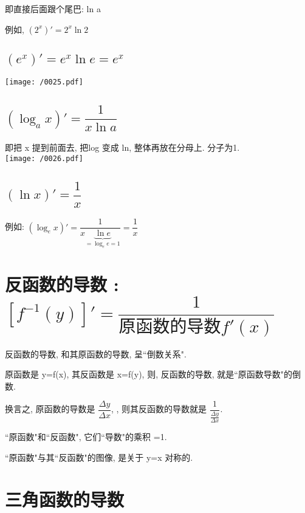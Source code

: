 \documentclass[UTF8]{ctexart}
\begin{document}
即直接后面跟个尾巴: ln a

例如, $(2^x)' = 2^x \ln 2$




\subsection{$(e^x)' = e^x \ln e = e^x$}

\texttt{[image: /0025.pdf]}




\subsection{$(\log_a x)' = \dfrac{1} {x \ln a}$}

即把 x 提到前面去, 把log 变成 ln, 整体再放在分母上. 分子为1. \\

\texttt{[image: /0026.pdf]}



\subsection{$(\ln x)' = \dfrac{1} {x}$}

例如: 
$\left( \log _ex \right) '=\dfrac{1}{x\underset{=\log _ee=1}{\underbrace{\ln e}}}=\dfrac{1}{x}$



\section{反函数的导数 : $\boxed{[f^{-1}(y)]' = \dfrac{1} {\text{原函数的导数} f'(x)}}$}


反函数的导数, 和其原函数的导数, 呈``倒数关系". 

原函数是 y=f(x), 其反函数是 x=f(y), 则, 反函数的导数, 就是``原函数导数"的倒数. 


换言之, 原函数的导数是 $\dfrac{\varDelta y}{\varDelta x} $, , 则其反函数的导数就是  $\dfrac{1}{\frac{\varDelta y}{\varDelta x}}$.

``原函数"和``反函数", 它们``导数"的乘积 =1.

``原函数"与其``反函数"的图像, 是关于 y=x 对称的.




\section{三角函数的导数}
\end{document}
